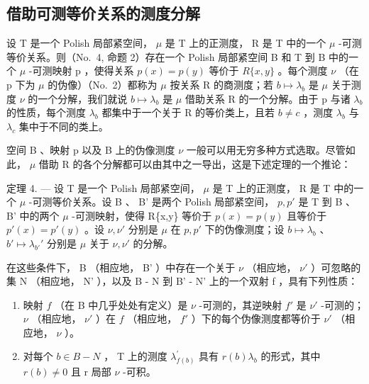 \subsection{借助可测等价关系的测度分解}

设 T 是一个 Polish 局部紧空间， \(\mu\) 是 T 上的正测度， R 是 T 中的一个 \(\mu\) -可测等价关系。则（No.~4, 命题 2）存在一个 Polish 局部紧空间 B 和 T 到 B 中的一个 \(\mu\) -可测映射 p ，使得关系 \(p(x) = p(y)\) 等价于 \(R\{x, y\}\) 。每个测度 \(\nu\) （在 p 下为 \(\mu\) 的伪像）（No.~2）都称为 \(\mu\) 按关系 R 的商测度；若 \(b \mapsto \lambda_b\) 是 \(\mu\) 关于测度 \(\nu\) 的一个分解，我们就说 \(b \mapsto \lambda_b\) 是 \(\mu\) 借助关系 R 的一个分解。由于 p 与诸 \(\lambda_b\) 的性质，每个测度 \(\lambda_b\) 都集中于一个关于 R 的等价类上，且若 \(b \neq c\) ，测度 \(\lambda_b\) 与 \(\lambda_c\) 集中于不同的类上。

空间 B 、映射 p 以及 B 上的伪像测度 \(\nu\) 一般可以用无穷多种方式选取。尽管如此， \(\mu\) 借助 R 的各个分解都可以由其中之一导出，这是下述定理的一个推论：

定理 4. --- 设 T 是一个 Polish 局部紧空间， \(\mu\) 是 T 上的正测度， R 是 T 中的一个 \(\mu\) -可测等价关系。设 B 、 B' 是两个 Polish 局部紧空间， \(p, p'\) 是 T 到 B 、 B' 中的两个 \(\mu\) -可测映射，使得 R\{x,y\} 等价于 \(p(x) = p(y)\) 且等价于 \(p'(x) = p'(y)\) 。设 \(\nu, \nu'\) 分别是 \(\mu\) 在 \(p, p'\) 下的伪像测度；设 \(b \mapsto \lambda_b\) 、 \(b' \mapsto \lambda_{b'}'\) 分别是 \(\mu\) 关于 \(\nu, \nu'\) 的分解。

在这些条件下， B （相应地， B' ）中存在一个关于 \(\nu\) （相应地， \(\nu'\) ）可忽略的集 N （相应地， N' ），以及 B - N 到 B' - N' 上的一个双射 f ，具有下列性质：

\begin{enumerate}
\def\labelenumi{\alph{enumi})}
\item
  映射 \(f\) （在 B 中几乎处处有定义）是 \(\nu\) -可测的，其逆映射 \(f'\) 是 \(\nu'\) -可测的； \(\nu\) （相应地， \(\nu'\) ）在 \(f\) （相应地， \(f'\) ）下的每个伪像测度都等价于 \(\nu'\) （相应地， \(\nu\) ）。
\item
  对每个 \(b \in B - N\) ， T 上的测度 \(\lambda_{f(b)}^{\prime}\) 具有 \(r(b)\lambda_{b}\) 的形式，其中 \(r(b) \neq 0\) 且 r 局部 \(\nu\) -可积。
\end{enumerate}


